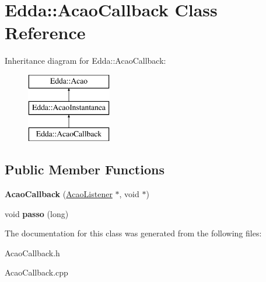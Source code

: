 \hypertarget{class_edda_1_1_acao_callback}{
\section{Edda::AcaoCallback Class Reference}
\label{class_edda_1_1_acao_callback}
}
Inheritance diagram for Edda::AcaoCallback:\begin{figure}[H]
\begin{center}
\leavevmode
\includegraphics[height=3.000000cm]{class_edda_1_1_acao_callback}
\end{center}
\end{figure}
\subsection*{Public Member Functions}
\begin{DoxyCompactItemize}
\item 
\hypertarget{class_edda_1_1_acao_callback_aeeab21390d435dce7b293167280dfc32}{
{\bfseries AcaoCallback} (\hyperlink{class_edda_1_1_acao_listener}{AcaoListener} $\ast$, void $\ast$)}
\label{class_edda_1_1_acao_callback_aeeab21390d435dce7b293167280dfc32}

\item 
\hypertarget{class_edda_1_1_acao_callback_a87d22c6b8521ce1dadf4bb1d827b5204}{
void {\bfseries passo} (long)}
\label{class_edda_1_1_acao_callback_a87d22c6b8521ce1dadf4bb1d827b5204}

\end{DoxyCompactItemize}


The documentation for this class was generated from the following files:\begin{DoxyCompactItemize}
\item 
AcaoCallback.h\item 
AcaoCallback.cpp\end{DoxyCompactItemize}
